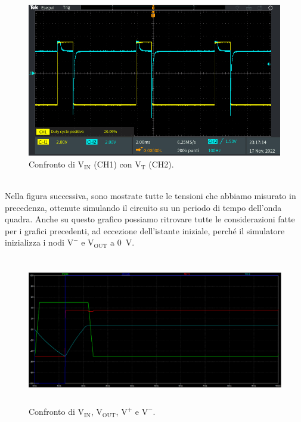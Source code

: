 \documentclass{report}
\begin{document}
\begin{figure}[h!]
	\centering
	\includegraphics[height=6.7cm]{immagini/TEK00013}
	\caption{Confronto di $\mathrm{V_{IN}}$ (CH1) con $\mathrm{V_T}$ (CH2).}
	\label{figura:TEK00013}
\end{figure}
\\Nella figura successiva, sono mostrate tutte le tensioni che abbiamo misurato in precedenza, ottenute simulando il circuito su un periodo di tempo dell'onda quadra. Anche su questo grafico possiamo ritrovare tutte le considerazioni fatte per i grafici precedenti, ad eccezione dell'istante iniziale, perché il simulatore inizializza i nodi $\mathrm{V^-}$ e $\mathrm{V_{OUT}}$ a \SI{0}{\volt}. 
\begin{figure}[h!]
	\centering
	\includegraphics[height=6.5cm]{immagini/plot_sim_2} 
	\caption{Confronto di $\mathrm{V_{IN}}$, $\mathrm{V_{OUT}}$, $\mathrm{V^+}$ e $\mathrm{V^-}$.}
	\label{figura:simulazione}
\end{figure}
\end{document}
